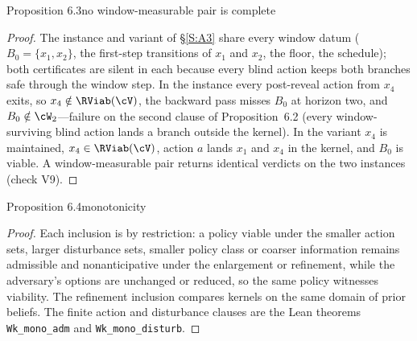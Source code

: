 \begin{restated}{Proposition 6.3}{no window-measurable pair is complete}
\end{restated}

\begin{proof}
The instance and variant of \S\ref{S:A3} share every window datum ($B_0=\{x_1,x_2\}$, the first-step transitions of $x_1$ and $x_2$, the floor, the schedule); both certificates are silent in each because every blind action keeps both branches safe through the window step. In the instance every post-reveal action from $x_4$ exits, so $x_4\notin\RViab(\cV)$, the backward pass misses $B_0$ at horizon two, and $B_0\notin\cW_2$---failure on the second clause of Proposition~6.2 (every window-surviving blind action lands a branch outside the kernel). In the variant $x_4$ is maintained, $x_4\in\RViab(\cV)$, action $a$ lands $x_1$ and $x_4$ in the kernel, and $B_0$ is viable. A window-measurable pair returns identical verdicts on the two instances (check V9).
\end{proof}

\begin{restated}{Proposition 6.4}{monotonicity}
\end{restated}

\begin{proof}
Each inclusion is by restriction: a policy viable under the smaller action sets, larger disturbance sets, smaller policy class or coarser information remains admissible and nonanticipative under the enlargement or refinement, while the adversary's options are unchanged or reduced, so the same policy witnesses viability. The refinement inclusion compares kernels on the same domain of prior beliefs. The finite action and disturbance clauses are the Lean theorems \texttt{Wk\_mono\_adm} and \texttt{Wk\_mono\_disturb}.
\end{proof}
